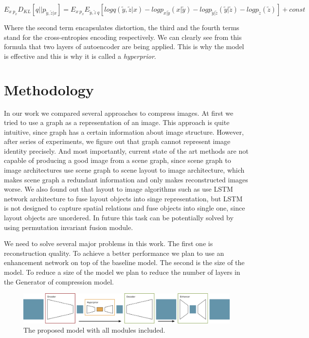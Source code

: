 \begin{equation}
    \label{eq:hyperprior}
    E_{x~p_x} D_{KL}[q || p_{\tilde{y},\tilde{z}|x}] = E_{x~p_x} E_{\tilde{y}, \tilde{z}~q} [log q(\tilde{y}, \tilde{z} | x) − log p_{x|\tilde{y}}(x | \tilde{y}) − log p_{\tilde{y}| \tilde{z}}(\tilde{y}|\tilde{z}) − log p_{\tilde{z}}(\tilde{z}) ] + const
\end{equation}

Where the second term encapsulates distortion, the third and the fourth terms stand for the cross-entropies encoding respectively. We can clearly see from this formula that two layers of autoencoder are being applied. This is why the model is effective and this is why it is called a \textit{hyperprior}.

\chapter{Methodology}
\label{chapter:methodology}

In our work we compared several approaches to compress images. At first we tried to use a graph as a representation of an image. This approach is quite intuitive, since graph has a certain information about image structure. However, after series of experiments, we figure out that graph cannot represent image identity precisely. And most importantly, current state of the art methods are not capable of producing a good image from a scene graph, since scene graph to image architectures use scene graph to scene layout to image architecture, which makes scene graph a redundant information and only makes reconstructed images worse. We also found out that layout to image algorithms such as \cite{Zhao_Meng_Yin_Sigal_2019} use LSTM network architecture to fuse layout objects into singe representation, but LSTM is not designed to capture spatial relations and fuse objects into single one, since layout objects are unordered. In future this task can be potentially solved by using permutation invariant fusion module.

We need to solve several major problems in this work. The first one is reconstruction quality. To achieve a better performance we plan to use an enhancement network on top of the baseline model. The second is the size of the model. To reduce a size of the model we plan to reduce the number of layers in the Generator of compression model.

\begin{figure}[!ht]
    \label{general-enhancement}
    \includegraphics[width=\textwidth]{figure/general-enhance.png}
    \caption{The proposed model with all modules included.}
\end{figure}

